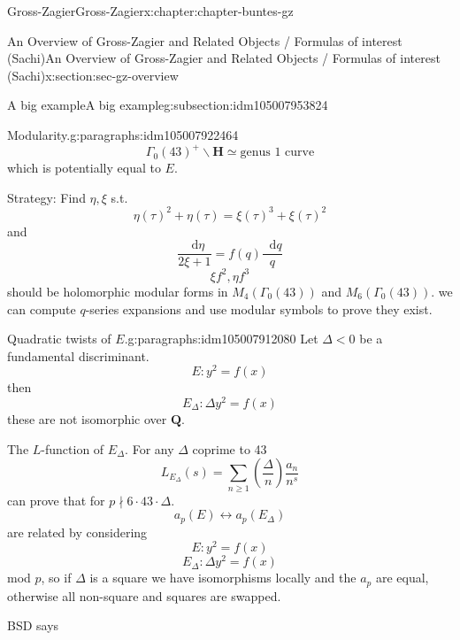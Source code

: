 \documentclass[oneside,10pt,]{book}
\numberwithin{equation}{section}
\newcommand{\diff}{\mathop{}\!\mathrm{d}}
\newcommand{\legendre}[2]{\left(\frac{#1}{#2}\right)}
\newcommand{\QQ}{\mathbf{Q}}
\newcommand{\HH}{\mathbf{H}}
\newcommand{\lt}{<}
\begin{document}
\begin{chapterptx}{Gross-Zagier}{}{Gross-Zagier}{}{}{x:chapter:chapter-buntes-gz}
\begin{sectionptx}{An Overview of Gross-Zagier and Related Objects \slash{} Formulas of interest (Sachi)}{}{An Overview of Gross-Zagier and Related Objects \slash{} Formulas of interest (Sachi)}{}{}{x:section:sec-gz-overview}
\begin{subsectionptx}{A big example}{}{A big example}{}{}{g:subsection:idm105007953824}
\begin{paragraphs}{Modularity.}{g:paragraphs:idm105007922464}
\begin{equation*}
\end{equation*}
%
\begin{equation*}
\Gamma _0(43)^+ \backslash \HH \simeq \text{genus 1 curve}
\end{equation*}
which is potentially equal to \(E\).%
\par
Strategy: Find \(\eta ,\xi \) s.t.%
\begin{equation*}
\eta(\tau )^2 + \eta(\tau ) = \xi (\tau )^3 + \xi (\tau )^2
\end{equation*}
and%
\begin{equation*}
\frac{\diff \eta}{2\xi  + 1} = f(q) \frac{\diff q}{q}
\end{equation*}
%
\begin{equation*}
\xi f^2, \eta f^3
\end{equation*}
should be holomorphic modular forms in \(M_4(\Gamma _0(43))\) and \(M_6(\Gamma _0(43))\). we can compute \(q\)-series expansions and use modular symbols to prove they exist.%
\end{paragraphs}%
\begin{paragraphs}{Quadratic twists of \(E\).}{g:paragraphs:idm105007912080}%
Let \(\Delta \lt  0\) be a fundamental discriminant.%
\begin{equation*}
E\colon y^2 = f(x)
\end{equation*}
then%
\begin{equation*}
E_{\Delta }\colon \Delta y^2 = f(x)
\end{equation*}
these are not isomorphic over \(\QQ\).%
\par
The \(L\)-function of \(E_\Delta \). For any \(\Delta \) coprime to 43%
\begin{equation*}
L_{E_\Delta } (s) = \sum_{n\ge 1} \legendre \Delta  n \frac{a_n}{n^s}
\end{equation*}
can prove that for \(p\nmid 6\cdot 43 \cdot \Delta \).%
\begin{equation*}
a_p(E) \leftrightarrow a_p(E_\Delta )
\end{equation*}
are related by considering%
\begin{equation*}
E\colon  y^2 = f(x)
\end{equation*}
%
\begin{equation*}
E_\Delta \colon  \Delta y^2= f(x)
\end{equation*}
mod \(p\), so if \(\Delta \) is a square we have isomorphisms locally and the \(a_p\) are equal, otherwise all non-square and squares are swapped.%
\par
BSD says%
\begin{equation*}

\end{equation*}
\end{paragraphs}
\end{subsectionptx}
\end{sectionptx}
\end{chapterptx}
\end{document}
